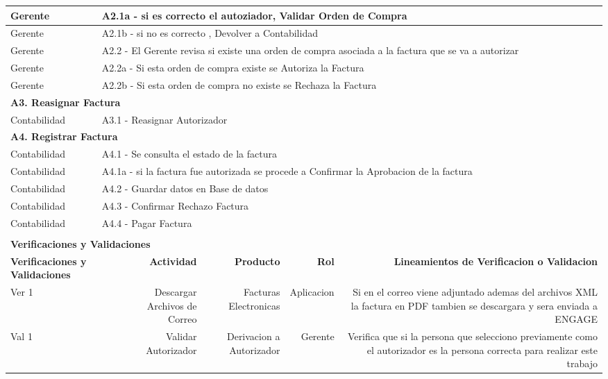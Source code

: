 \begin{longtable}{|llrrrrrr|}
    Gerente & \multicolumn{7}{|l|}{A2.1a - si es correcto el autoziador, Validar Orden de Compra } \\ \hline
    Gerente & \multicolumn{7}{|l|}{A2.1b - si no es correcto , Devolver a Contabilidad} \\ \hline
    Gerente & \multicolumn{7}{|m{12cm}|}{A2.2 - El Gerente revisa si existe una orden de compra asociada a la factura que se va a autorizar } \\ \hline
    Gerente & \multicolumn{7}{|l|}{A2.2a - Si esta orden de compra existe se Autoriza la Factura } \\ \hline
	Gerente & \multicolumn{7}{|l|}{A2.2b - Si esta orden de compra no existe se Rechaza la Factura } \\ \hline
    \multicolumn{8}{|l|}{\textbf{A3. Reasignar Factura}} \\ \hline
    Contabilidad & \multicolumn{7}{|l|}{A3.1 - Reasignar Autorizador} \\ \hline
    \multicolumn{8}{|l|}{\textbf{A4. Registrar Factura}} \\ \hline
    Contabilidad & \multicolumn{7}{|l|}{A4.1 - Se consulta el estado de la factura} \\ \hline
    Contabilidad & \multicolumn{7}{|m{12cm}|}{A4.1a - si la factura fue autorizada se procede a Confirmar la Aprobacion de la factura} \\ \hline
    Contabilidad  & \multicolumn{7}{|l|}{A4.2 - Guardar datos en Base de datos} \\ \hline
    Contabilidad  & \multicolumn{7}{|l|}{A4.3 - Confirmar Rechazo Factura} \\ \hline
    Contabilidad  & \multicolumn{7}{|l|}{A4.4 - Pagar Factura} \\ \hline
     & & & & & & & \\ \hline
	\multicolumn{8}{|l|}{\textbf{Verificaciones y Validaciones}} \\ \hline
	\multicolumn{2}{|m{3cm}|}{\textbf{Verificaciones y Validaciones}} & \multicolumn{1}{m{2cm}|}{\textbf{Actividad}} & \multicolumn{1}{m{2,2cm}|}{\textbf{Producto}} & \multicolumn{1}{m{1.5cm}|}{\textbf{Rol}} &\multicolumn{3}{m{4cm}|}{\textbf{Lineamientos de Verificacion o Validacion}} \\ \hline
	\multicolumn{2}{|m{3cm}|}{Ver 1} & \multicolumn{1}{m{2cm}|}{Descargar Archivos de Correo} & \multicolumn{1}{m{2.2cm}|}{Facturas Electronicas} & \multicolumn{1}{m{2cm}|}{Aplicacion} & \multicolumn{3}{m{4cm}|}{Si en el correo viene adjuntado ademas del archivos XML la factura en PDF tambien se descargara y sera enviada a ENGAGE} \\ \hline
	\multicolumn{2}{|m{3cm}|}{Val 1} & \multicolumn{1}{m{2cm}|}{Validar Autorizador} & \multicolumn{1}{m{2.2cm}|}{Derivacion a Autorizador} & \multicolumn{1}{m{2cm}|}{Gerente} & \multicolumn{3}{m{4cm}|}{Verifica que si la persona que selecciono previamente como el autorizador es la persona correcta para realizar este trabajo} \\ \hline
		

\end{longtable}
